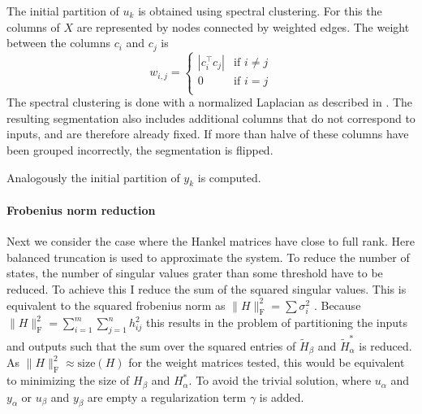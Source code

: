 \documentclass[doctype=mastersthesis,BCOR=15mm,biblatex]{ldvbook}%
\begin{document}
The initial partition of $u_k$ is obtained using spectral clustering.
For this the columns of $X$ are represented by nodes connected by weighted edges.
The weight between the columns $c_i$ and $c_j$ is  
\begin{equation}
	w_{i,j}=
	\begin{cases}
	|c_i^\top c_j| & \text{if } i\neq j\\
	0  & \text{if } i=j\\
	\end{cases}
\end{equation}
The spectral clustering is done with a normalized Laplacian as described in \cite{higham_spectral_2007}.
The resulting segmentation also includes additional columns that do not correspond to inputs, and are therefore already fixed.
If more than halve of these columns have been grouped incorrectly, the segmentation is flipped.

Analogously the initial partition of $y_k$ is computed.


\paragraph{Frobenius norm reduction}
Next we consider the case where the Hankel matrices have close to full rank.
Here balanced truncation is used to approximate the system.
To reduce the number of states, the number of singular values grater than some threshold have to be reduced.
To achieve this I reduce the sum of the squared singular values.
This is equivalent to the squared frobenius norm as $\|H\|_\text{F}^2 = \sum \sigma_i^2$ \cite[p.~67]{bai_matrix_2021}. 
Because $\|H\|_\text{F}^2 = \sum_{i=1}^{m}\sum_{j=1}^{n} h_{ij}^2$ this results in the problem of partitioning the inputs and outputs such that the sum over the squared entries of $\tilde{H}_\beta$ and $\tilde{H}_\alpha^*$ is reduced.
As $\|H\|_\text{F}^2 \approx \text{size}(H)$ for the weight matrices tested, this would be equivalent to minimizing the size of $H_\beta$ and $H_\alpha^*$.
To avoid the trivial solution, where $u_\alpha$ and $y_\alpha$ or $u_\beta$  and $y_\beta$ are empty a regularization term $\gamma$ is added.
\end{document}
